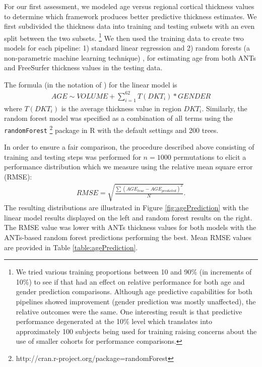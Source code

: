 For our first assessment, we modeled age versus regional cortical thickness values 
to determine which framework produces better predictive thickness estimates.  We first
subdivided the thickness data into training and testing subsets with an even split
between the two subsets.%
\footnote{
We tried various training proportions between 10 and 90\% (in increments of 10\%)
to see if that had an effect on relative performance for both age and 
gender prediction comparisons. Although age predictive capabilities for 
both pipelines showed improvement (gender prediction was mostly unaffected), 
the relative outcomes were the same.  
One interesting result
is that predictive performance degenerated at the 10\% level
which translates into approximately 100 subjects being used for training
raising concerns about the use of smaller cohorts for performance comparisons.
}
We then used the training data to create two models for each pipeline:
1) standard linear regression
and 2) random forests (a non-parametric machine learning technique) \cite{breiman2001},
for estimating age from both ANTs and FreeSurfer thickness values in the testing data.  

The formula (in the notation of \cite{wilkinson1973}) for the linear model is
\begin{align}
  AGE \sim VOLUME + \sum_{i=1}^{62} T(DKT_{i})*GENDER
\end{align}
where $T(DKT_{i})$ is the average thickness value in region $DKT_{i}$.
Similarly, the random forest 
model was specified as a combination of all terms
using the {\tt randomForest}%
\footnote{
http://cran.r-project.org/package=randomForest
}
package in R with the default settings and 200 trees.

In order to ensure a fair comparison, the procedure described above consisting
of training and testing steps was performed for $n = 1000$ permutations to elicit a 
performance distribution which we measure using the relative mean square
error (RMSE):
\begin{align}
  RMSE = \sqrt{\frac{\sum \left(AGE_{true} - AGE_{predicted} \right)^2}{N}}.
\end{align}
The resulting distributions are illustrated in Figure \ref{fig:agePrediction}
with the linear model results displayed on the left and random forest results
on the right.  The RMSE value was lower with ANTs thickness values for both 
models with the ANTs-based random forest predictions performing the best.  
Mean RMSE values are provided in Table \ref{table:agePrediction}.

